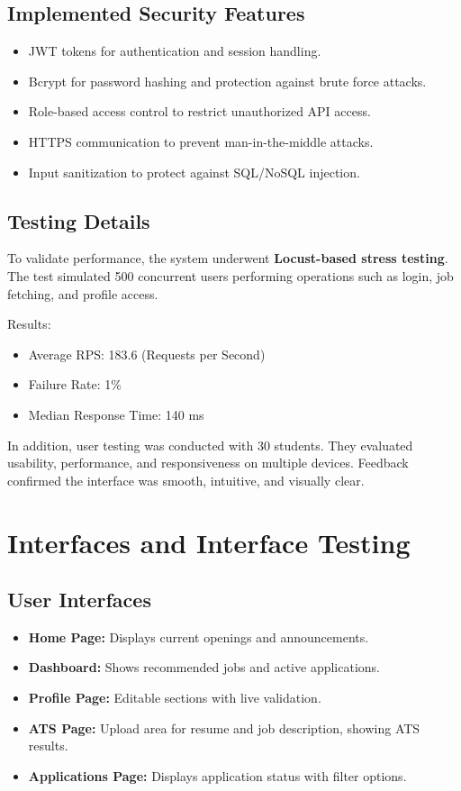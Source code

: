 \documentclass[14pt]{extarticle}
\begin{document}
\subsection{Implemented Security Features}
\begin{itemize}
  \item JWT tokens for authentication and session handling.
  \item Bcrypt for password hashing and protection against brute force attacks.
  \item Role-based access control to restrict unauthorized API access.
  \item HTTPS communication to prevent man-in-the-middle attacks.
  \item Input sanitization to protect against SQL/NoSQL injection.
\end{itemize}

\subsection{Testing Details}
To validate performance, the system underwent \textbf{Locust-based stress testing}.  
The test simulated 500 concurrent users performing operations such as login, job fetching, and profile access.

Results:
\begin{itemize}[itemsep=1pt, topsep=1pt, parsep=0pt, partopsep=0pt]
  \item Average RPS: 183.6 (Requests per Second)
  \item Failure Rate: 1\%
  \item Median Response Time: 140 ms
\end{itemize}

In addition, user testing was conducted with 30 students. They evaluated usability, performance, and responsiveness on multiple devices. Feedback confirmed the interface was smooth, intuitive, and visually clear.

\section{Interfaces and Interface Testing}

\subsection{User Interfaces}
\begin{itemize}
  \item \textbf{Home Page:} Displays current openings and announcements.
  \item \textbf{Dashboard:} Shows recommended jobs and active applications.
  \item \textbf{Profile Page:} Editable sections with live validation.
  \item \textbf{ATS Page:} Upload area for resume and job description, showing ATS results.
  \item \textbf{Applications Page:} Displays application status with filter options.
\end{itemize}
\end{document}
